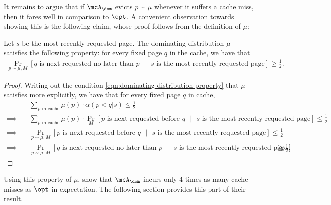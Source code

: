 It remains to argue that if $\mcA_\dom$ evicts $p \sim \mu$ whenever it suffers a cache miss, then it fares well in comparison to $\opt$. A convenient observation towards showing this is the following claim, whose proof follows from the definition of $\mu$:
\begin{claim}
    \label{claim:dominating-distribution-probability}
    Let $s$ be the most recently requested page. The dominating distribution $\mu$ satisfies the following property: for every fixed page $q$ in the cache, we have that
    \begin{align}
        \Pr_{p \sim \mu, M}[\text{$q$ is next requested no later than $p$ }|\text{ $s$ is the most recently requested page}] \ge \frac{1}{2}.
    \end{align}
\end{claim}
\begin{proof}
    Writing out the condition \eqref{eqn:dominating-distribution-property} that $\mu$ satisfies more explicitly, we have that for every fixed page $q$ in cache,
    \begin{align*}
        &\sum_{\text{$p$ in cache}}\mu(p)\cdot \alpha(p<q|s) \le \frac{1}{2} \\
        \implies \quad & \sum_{\text{$p$ in cache}}\mu(p)\cdot \Pr_M[\text{$p$ is next requested before $q$ }|\text{ $s$ is the most recently requested page}] \le \frac{1}{2} \\
        \implies \quad &\Pr_{p \sim \mu, M}[\text{$p$ is next requested before $q$ }|\text{ $s$ is the most recently requested page}] \le \frac12 \\
        \implies \quad &\Pr_{p \sim \mu, M}[\text{$q$ is next requested no later than $p$ }|\text{ $s$ is the most recently requested page}] \ge \frac{1}{2}.
    \end{align*}
\end{proof}

Using this property of $\mu$, \cite{lund1999paging} show that $\mcA_\dom$ incurs only $4$ times as many cache misses as $\opt$ in expectation. The following section provides this part of their result.

